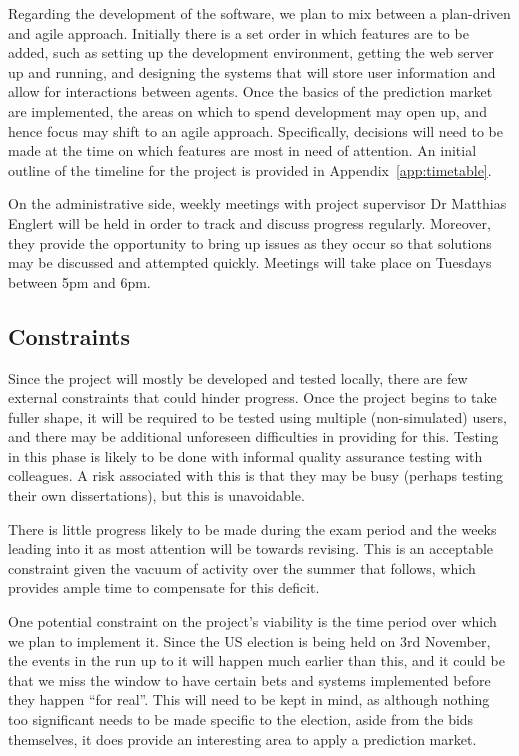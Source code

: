 \documentclass[10pt,a4paper]{article}
\theoremstyle{plain}
\theoremstyle{definition}
\begin{document}
	Regarding the development of the software, we plan to mix between a
	plan-driven and agile approach. Initially there is a set order in which
	features are to be added, such as setting up the development environment,
	getting the web server up and running, and designing the systems that will
	store user information and allow for interactions between agents. Once the
	basics of the prediction market are implemented, the areas on which to
	spend development may open up, and hence focus may shift to an agile
	approach. Specifically, decisions will need to be made at the time on which
	features are most in need of attention. An initial outline of the timeline
	for the project is provided in Appendix~\ref{app:timetable}.

	On the administrative side, weekly meetings with project supervisor Dr
	Matthias Englert will be held in order to track and discuss progress
	regularly. Moreover, they provide the opportunity to bring up issues as
	they occur so that solutions may be discussed and attempted quickly.
	Meetings will take place on Tuesdays between 5pm and 6pm.

	\subsection{Constraints}

	Since the project will mostly be developed and tested locally, there are
	few external constraints that could hinder progress. Once the project
	begins to take fuller shape, it will be required to be tested using
	multiple (non-simulated) users, and there may be additional unforeseen
	difficulties in providing for this. Testing in this phase is likely to be
	done with informal quality assurance testing with colleagues. A risk
	associated with this is that they may be busy (perhaps testing their own
	dissertations), but this is unavoidable.

	There is little progress likely to be made during the exam period and the
	weeks leading into it as most attention will be towards revising. This is
	an acceptable constraint given the vacuum of activity over the summer that
	follows, which provides ample time to compensate for this deficit.

	One potential constraint on the project's viability is the time period over
	which we plan to implement it. Since the US election is being held on 3rd
	November, the events in the run up to it will happen much earlier than
	this, and it could be that we miss the window to have certain bets and
	systems implemented before they happen ``for real''. This will need to be
	kept in mind, as although nothing too significant needs to be made specific
	to the election, aside from the bids themselves, it does provide an
	interesting area to apply a prediction market.
\end{document}
